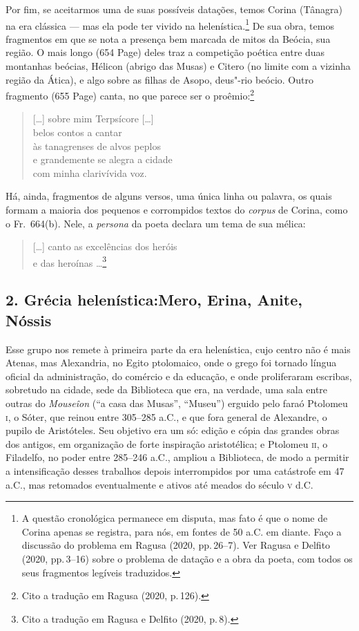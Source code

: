 Por fim, se aceitarmos uma de suas possíveis datações, temos Corina (Tânagra) na
era clássica --- mas ela pode ter vivido na helenística.\footnote{A questão cronológica permanece em disputa, mas fato é que o nome de Corina apenas se registra, para nós, em
fontes de 50 a.C. em diante. Faço a discussão do problema em Ragusa (2020, pp.\,26--7). Ver Ragusa e Delfito (2020, pp.\,3--16) sobre o problema de datação e a obra da poeta, com todos os seus fragmentos legíveis traduzidos.} De sua obra, temos
fragmentos em que se nota a presença bem marcada de mitos da Beócia, sua região.
O mais longo (654 Page) deles traz a competição poética entre duas montanhas beócias,
Hélicon (abrigo das Musas) e Citero (no limite com a vizinha região da Ática),
e algo sobre as filhas de Asopo, deus"-rio beócio. Outro fragmento (655 Page)
canta, no que parece ser o proêmio:\footnote{Cito a tradução em Ragusa (2020, p.\,126).}

\begin{quote}
\mbox[\ldots{}] sobre mim Terpsícore [\ldots{}]\\
belos contos a cantar\\
às tanagrenses de alvos peplos\\
e grandemente se alegra a cidade\\
com minha clarivívida voz.
\end{quote}

Há, ainda, fragmentos de alguns versos, uma única linha ou palavra, os quais
formam a maioria dos pequenos e corrompidos textos do \textit{corpus} de
Corina, como o Fr.~664(b). Nele, a \textit{persona} da poeta declara um
tema de sua mélica:

\begin{quote}
\mbox[\ldots{}] canto as excelências dos heróis\\
e das heroínas \ldots{}\footnote{Cito a tradução em Ragusa e Delfito (2020, p.\,8).}
\end{quote}

\smallskip

\subsection*{2. Grécia helenística:\break Mero, Erina, Anite, Nóssis}

\smallskip

Esse grupo nos remete à primeira parte da era helenística, cujo centro não é
mais Atenas, mas Alexandria, no Egito ptolomaico, onde o grego foi tornado
língua oficial da administração, do comércio e da educação, e onde proliferaram
escribas, sobretudo na cidade, sede da Biblioteca que era, na
verdade, uma sala entre outras do \textit{Mouseîon} (“a casa das Musas”,
“Museu”) erguido pelo faraó Ptolomeu \textsc{i}, o Sóter, que reinou entre 305--285 a.C.,
e que fora general de Alexandre, o pupilo de Aristóteles. Seu objetivo era um
só: edição e cópia das grandes obras dos antigos, em organização de forte
inspiração aristotélica; e Ptolomeu \textsc{ii}, o Filadelfo, no poder entre 285--246
a.C., ampliou a Biblioteca, de modo a permitir a intensificação desses
trabalhos depois interrompidos por uma catástrofe em 47 a.C., mas retomados
eventualmente e ativos até meados do século \textsc{v} d.C. 

